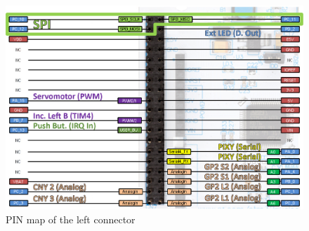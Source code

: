 \documentclass[11pt,english]{article}
\begin{document}
\begin{figure}
 \centering
 \includegraphics[width=\textwidth]{images/left_connector}
 \caption{PIN map of the left connector}
 \label{fig:left_connector}
\end{figure}
\end{document}
